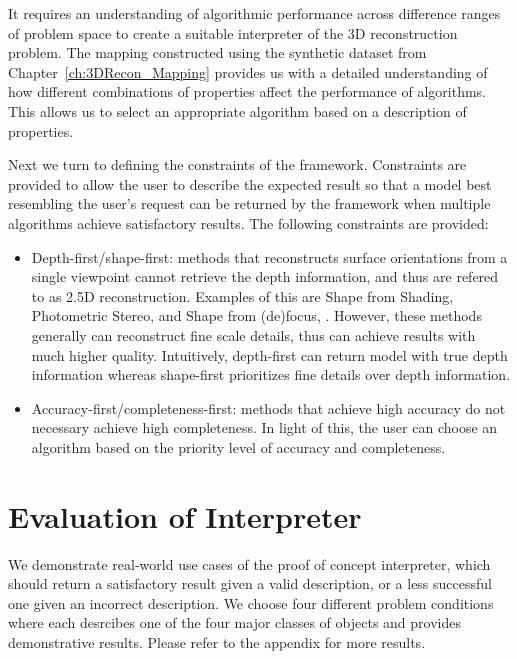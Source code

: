 It requires an understanding of algorithmic performance across difference ranges of problem space to create a suitable interpreter of the 3D reconstruction problem. The mapping constructed using the synthetic dataset from Chapter~\ref{ch:3DRecon_Mapping} provides us with a detailed understanding of how different combinations of properties affect the performance of algorithms. This allows us to select an appropriate algorithm based on a description of properties.

Next we turn to defining the constraints of the framework. Constraints are provided to allow the user to describe the expected result so that a model best resembling the user's request can be returned by the framework when multiple algorithms achieve satisfactory results. The following constraints are provided: 
\begin{itemize}
\item Depth-first/shape-first: methods that reconstructs surface orientations from a single viewpoint cannot retrieve the depth information, and thus are refered to as 2.5D reconstruction. Examples of this are Shape from Shading, Photometric Stereo, and Shape from (de)focus, \etc. However, these methods generally can reconstruct fine scale details, thus can achieve results with much higher quality. Intuitively, depth-first can return model with true depth information whereas shape-first prioritizes fine details over depth information.
\item Accuracy-first/completeness-first: methods that achieve high accuracy do not necessary achieve high completeness. In light of this, the user can choose an algorithm based on the priority level of accuracy and completeness.
\end{itemize}

\section{Evaluation of Interpreter}
\label{sec:interp_useful}
We demonstrate real-world use cases of the proof of concept interpreter, which should return a satisfactory result given a valid description, or a less successful one given an incorrect description. We choose four different problem conditions where each desrcibes one of the four major classes of objects and provides demonstrative results. Please refer to the appendix for more results.

